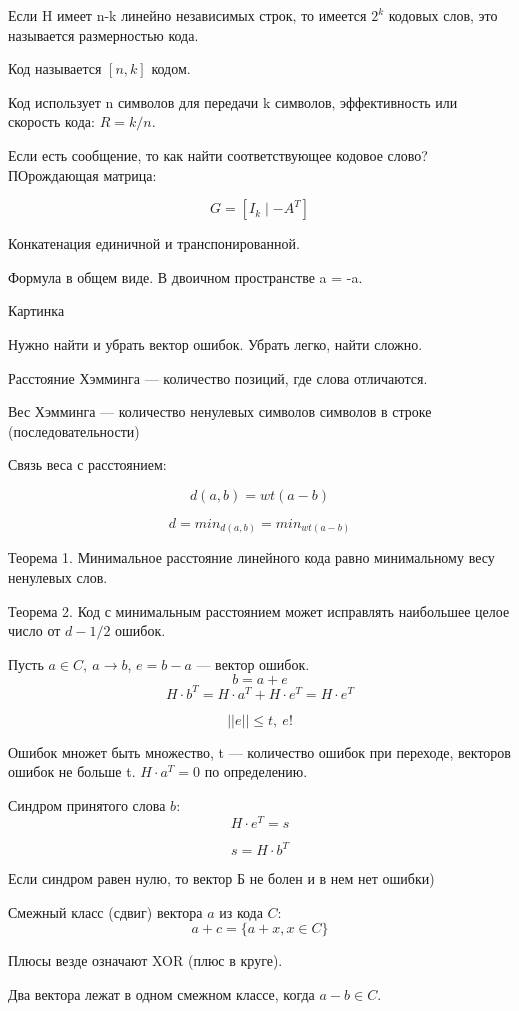 {Если H имеет n-k линейно независимых строк, то имеется $2^k$ кодовых слов, это
называется размерностью кода.

Код называется $[n, k]$ кодом.

Код использует n символов для передачи k символов, эффективность или скорость
кода: $R = k/n$.

Если есть сообщение, то как найти соответствующее кодовое слово? ПОрождающая
матрица:

\[
    G = [I_k \mid -A^T]
\]

Конкатенация единичной и транспонированной.

Формула в общем виде. В двоичном пространстве a = -a.

Картинка

Нужно найти и убрать вектор ошибок. Убрать легко, найти сложно. 

Расстояние Хэмминга --- количество позиций, где слова отличаются.

Вес Хэмминга --- количество ненулевых символов символов в строке
(последовательности)

Связь веса с расстоянием:

\[
    d(a, b) = wt(a - b)
\]

\[
    d = min_{d(a, b)} = min_{wt(a - b)}
\]

Теорема 1. Минимальное расстояние линейного кода равно минимальному весу
ненулевых слов.

Теорема 2. Код с минимальным расстоянием может исправлять наибольшее целое
число от $d - 1/2$ ошибок.

Пусть $a \in C,\ a \to b$, $e = b - a$ --- вектор ошибок.
\[
    b = a + e
\]
\[
    H \cdot b^T = H \cdot a^T + H \cdot e^T = H \cdot e^T
\]

\[
    ||e|| \leq t,\ e!
\]

Ошибок множет быть множество, t --- количество ошибок при переходе, векторов
ошибок не больше t. $H \cdot a^T = 0$ по определению.

Синдром принятого слова $b$:
\[
    H \cdot e^T = s
\]

\[
    s = H \cdot b^T
\]

Если синдром равен нулю, то вектор Б не болен и в нем нет ошибки)

Смежный класс (сдвиг) вектора $a$ из кода $C$:
\[
    a + c = \{ a + x, x \in C \}
\]

Плюсы везде означают XOR (плюс в круге).

Два вектора лежат в одном смежном классе, когда $a - b \in C$.

}
